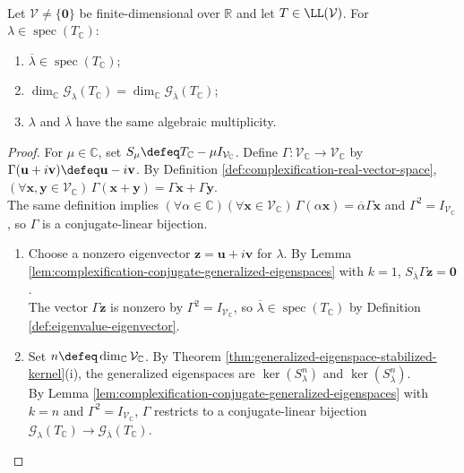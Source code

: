 \begin{corollary} \label{cor:complexification-conjugate-eigenvalue-multiplicities} \\
Let $\mathcal{V}\neq\{\mathbf{0}\}$ be finite-dimensional over $\mathbb{R}$ and let $T\in\LL(\mathcal{V})$. For $\lambda\in\operatorname{spec}(T_{\mathbb{C}})$:
\begin{enumerate}[label=(\roman*)]
\setlength{\itemsep}{0pt}
\item $\overline{\lambda}\in\operatorname{spec}(T_{\mathbb{C}})$;
\item $\dim_{\mathbb{C}}\mathcal{G}_{\lambda}(T_{\mathbb{C}})=\dim_{\mathbb{C}}\mathcal{G}_{\overline{\lambda}}(T_{\mathbb{C}})$;
\item $\lambda$ and $\overline{\lambda}$ have the same algebraic multiplicity.
\end{enumerate}
\begin{proof}
For $\mu\in\mathbb{C}$, set $S_{\mu}\defeq T_{\mathbb{C}}-\mu I_{\mathcal{V}_{\mathbb{C}}}$. Define $\Gamma:\mathcal{V}_{\mathbb{C}}\to\mathcal{V}_{\mathbb{C}}$ by $\Gamma(\mathbf{u}+i\mathbf{v})\defeq\mathbf{u}-i\mathbf{v}$. By Definition \ref{def:complexification-real-vector-space}, $(\forall\mathbf{x},\mathbf{y}\in\mathcal{V}_{\mathbb{C}})\,\Gamma(\mathbf{x}+\mathbf{y})=\Gamma\mathbf{x}+\Gamma\mathbf{y}$.\\
The same definition implies $(\forall\alpha\in\mathbb{C})(\forall\mathbf{x}\in\mathcal{V}_{\mathbb{C}})\,\Gamma(\alpha\mathbf{x})=\overline{\alpha}\Gamma\mathbf{x}$ and $\Gamma^2=I_{\mathcal{V}_{\mathbb{C}}}$, so $\Gamma$ is a conjugate-linear bijection.
\begin{enumerate}[label=(\roman*)]
\setlength{\itemsep}{0pt}
\item Choose a nonzero eigenvector $\mathbf{z}=\mathbf{u}+i\mathbf{v}$ for $\lambda$. By Lemma \ref{lem:complexification-conjugate-generalized-eigenspaces} with $k=1$, $S_{\overline{\lambda}}\Gamma\mathbf{z}=\mathbf{0}$.\\
The vector $\Gamma\mathbf{z}$ is nonzero by $\Gamma^2=I_{\mathcal{V}_{\mathbb{C}}}$, so $\overline{\lambda}\in\operatorname{spec}(T_{\mathbb{C}})$ by Definition \ref{def:eigenvalue-eigenvector}.
\item Set $n\defeq\dim_{\mathbb{C}}\mathcal{V}_{\mathbb{C}}$. By Theorem \ref{thm:generalized-eigenspace-stabilized-kernel}(i), the generalized eigenspaces are $\ker(S_{\lambda}^n)$ and $\ker(S_{\overline{\lambda}}^n)$.\\
By Lemma \ref{lem:complexification-conjugate-generalized-eigenspaces} with $k=n$ and $\Gamma^2=I_{\mathcal{V}_{\mathbb{C}}}$, $\Gamma$ restricts to a conjugate-linear bijection $\mathcal{G}_{\lambda}(T_{\mathbb{C}})\to\mathcal{G}_{\overline{\lambda}}(T_{\mathbb{C}})$.\\

\end{enumerate}
\end{proof}
\end{corollary}
